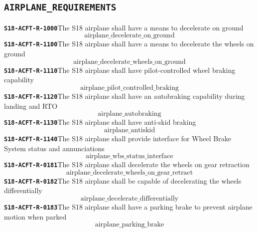 \documentclass[11pt,a4paper]{article}
\begin{document}
\subsection*{\texttt{AIRPLANE\_REQUIREMENTS}}
\noindent\textbf{\texttt{S18-ACFT-R-1000}}\quad The S18 airplane shall have a means to decelerate on ground
\begin{dmath*}
\text{airplane\_decelerate\_on\_ground}
\end{dmath*}
\noindent\textbf{\texttt{S18-ACFT-R-1100}}\quad The S18 airplane shall have a means to decelerate the wheels on ground
\begin{dmath*}
\text{airplane\_decelerate\_wheels\_on\_ground}
\end{dmath*}
\noindent\textbf{\texttt{S18-ACFT-R-1110}}\quad The S18 airplane shall have pilot-controlled wheel braking capability
\begin{dmath*}
\text{airplane\_pilot\_controlled\_braking}
\end{dmath*}
\noindent\textbf{\texttt{S18-ACFT-R-1120}}\quad The S18 airplane shall have an autobraking capability during landing and RTO
\begin{dmath*}
\text{airplane\_autobraking}
\end{dmath*}
\noindent\textbf{\texttt{S18-ACFT-R-1130}}\quad The S18 airplane shall have anti-skid braking
\begin{dmath*}
\text{airplane\_antiskid}
\end{dmath*}
\noindent\textbf{\texttt{S18-ACFT-R-1140}}\quad The S18 airplane shall provide interface for Wheel Brake System status and annunciations
\begin{dmath*}
\text{airplane\_wbs\_status\_interface}
\end{dmath*}
\noindent\textbf{\texttt{S18-ACFT-R-0181}}\quad The S18 airplane shall decelerate the wheels on gear retraction
\begin{dmath*}
\text{airplane\_decelerate\_wheels\_on\_gear\_retract}
\end{dmath*}
\noindent\textbf{\texttt{S18-ACFT-R-0182}}\quad The S18 airplane shall be capable of decelerating the wheels differentially
\begin{dmath*}
\text{airplane\_decelerate\_differentially}
\end{dmath*}
\noindent\textbf{\texttt{S18-ACFT-R-0183}}\quad The S18 airplane shall have a parking brake to prevent airplane motion when parked
\begin{dmath*}
\text{airplane\_parking\_brake}
\end{dmath*}
\end{document}
